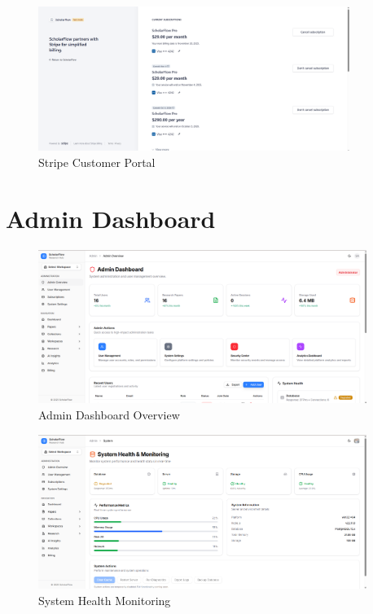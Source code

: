\begin{figure}[H]
\centering
\includegraphics[width=0.9\textwidth]{images/screenshots/stripe_customer_portal.png}
\caption{Stripe Customer Portal}
\label{fig:screenshot-customer-portal}
\end{figure}

\section{Admin Dashboard}
\label{sec:screenshots-admin}

\begin{figure}[H]
\centering
\includegraphics[width=0.95\textwidth]{images/screenshots/admin_overview.png}
\caption{Admin Dashboard Overview}
\label{fig:screenshot-admin-overview}
\end{figure}

\begin{figure}[H]
\centering
\includegraphics[width=0.95\textwidth]{images/screenshots/system_health.png}
\caption{System Health Monitoring}
\label{fig:screenshot-system-health}
\end{figure}

